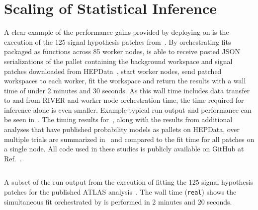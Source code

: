 \section{Scaling of Statistical Inference}\label{sec:results}
%
A clear example of the performance gains provided by deploying \pyhf{} on \funcX{} is the execution of the 125 signal hypothesis patches from~\cite{SUSY-2019-08}.
By orchestrating \pyhf{} fits packaged as \funcX{} functions across 85 worker nodes, \funcX{} is able to receive posted JSON serializations of the \pyhf{} pallet containing the background workspace and signal patches downloaded from HEPData~\cite{ATLAS_SUSY_1Lbb_pallet}, start \funcX{} worker nodes, send patched workspaces to each worker, fit the workspace and return the results with a wall time of under 2 minutes and 30 seconds.
As this wall time includes data transfer to and from RIVER and worker node orchestration time, the time required for inference alone is even smaller.
Example typical run output and performance can be seen in~.
The timing results for~\cite{ATLAS_SUSY_1Lbb_pallet}, along with the results from additional analyses that have published probability models as \pyhf{} pallets on HEPData, over multiple trials are summarized in~ and compared to the fit time for all patches on a single node.
All code used in these studies is publicly available on GitHub at Ref.~\cite{study_code}.



\begin{listing}
 \inputminted{text}{src/code/funcX_demo_output.txt}
 \caption{A subset of the run output from the execution of fitting the 125 signal hypothesis patches for the published ATLAS analysis~\cite{SUSY-2019-08}.
 The wall time (\texttt{real}) shows the simultaneous fit orchestrated by \funcX{} is performed in 2 minutes and 20 seconds.}
 \label{lst:funcX_demo_output}
\end{listing}
